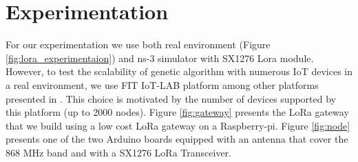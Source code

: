 \section{Experimentation} \label{sec:Experimentation}

For our experimentation we use both real environment (Figure \ref{fig:lora_experimentaion}) and ns-3 simulator with SX1276 Lora module.
However,
	to test the scalability of genetic algorithm with numerous IoT devices in a real environment,
	we use FIT IoT-LAB platform among other platforms presented in \cite{tonneau_how_2015}.
This choice is motivated by the number of devices supported by this platform (up to 2000 nodes).
Figure \ref{fig:gateway} presents the LoRa gateway that we build using a low cost LoRa gateway \cite{lowcostloragateway} on a Raspberry-pi.
Figure \ref{fig:node}  presents one of the two Arduino boards equipped with an antenna that cover the 868 MHz band and with a SX1276 LoRa Transceiver.



